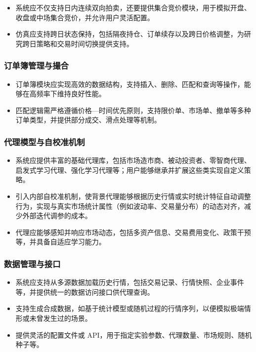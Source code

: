 \begin{itemize}
  \item 系统应不仅支持日内连续双向拍卖，还要提供集合竞价模块，用于模拟开盘、收盘或中场集合竞价，并允许用户灵活配置。
  \item 仿真应支持跨日状态保持，包括隔夜持仓、订单续存以及跨日价格调整，为研究跨日策略和交易时间切换提供支持。
\end{itemize}

\subsubsection{订单簿管理与撮合}

\begin{itemize}
  \item 订单簿模块应实现高效的数据结构，支持插入、删除、匹配和查询等操作，能够在高频率下维持良好性能。
  \item 匹配逻辑需严格遵循价格—时间优先原则，支持限价单、市场单、撤单等多种订单类型，并提供部分成交、滑点处理等机制。
\end{itemize}

\subsubsection{代理模型与自校准机制}

\begin{itemize}
  \item 系统应提供丰富的基础代理库，包括市场造市商、被动投资者、零智商代理、启发式学习代理、强化学习代理等；用户能够继承并扩展这些类实现自定义策略。
  \item 引入内部自校准机制，使背景代理能够根据历史行情或实时统计特征自动调整行为，实现与真实市场统计属性（例如波动率、交易量分布）的动态对齐，减少外部迭代调参的成本。
  \item 代理应能够感知并响应市场动态，包括多资产信息、交易费用变化、政策干预等，并具备自适应学习能力。
\end{itemize}

\subsubsection{数据管理与接口}

\begin{itemize}
  \item 系统应支持从多源数据加载历史行情，包括交易记录、行情快照、企业事件等，并提供统一的数据访问接口供代理查询。
  \item 支持生成合成数据，如基于统计模型或随机过程的行情序列，以便模拟极端情形或未曾发生过的场景。
  \item 提供灵活的配置文件或 API，用于指定实验参数、代理数量、市场规则、随机种子等。
\end{itemize}


